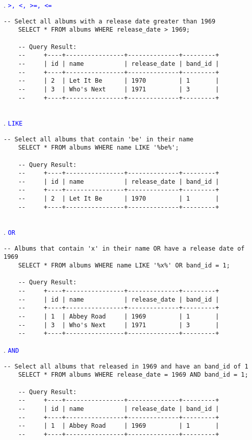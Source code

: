 . \textcolor{blue}{\texttt{>, <, >=, <=}}
\begin{lstlisting}[style=sql]
    -- Select all albums with a release date greater than 1969
    SELECT * FROM albums WHERE release_date > 1969;

    -- Query Result:
    --     +----+----------------+--------------+---------+
    --     | id | name           | release_date | band_id |
    --     +----+----------------+--------------+---------+
    --     | 2  | Let It Be      | 1970         | 1       |
    --     | 3  | Who's Next     | 1971         | 3       |
    --     +----+----------------+--------------+---------+
    
\end{lstlisting}

. \textcolor{blue}{\texttt{LIKE}}
\begin{lstlisting}[style=sql]
    -- Select all albums that contain 'be' in their name
    SELECT * FROM albums WHERE name LIKE '%be%';

    -- Query Result:
    --     +----+----------------+--------------+---------+
    --     | id | name           | release_date | band_id |
    --     +----+----------------+--------------+---------+
    --     | 2  | Let It Be      | 1970         | 1       |
    --     +----+----------------+--------------+---------+
    
\end{lstlisting}
. \textcolor{blue}{\texttt{OR}}
\begin{lstlisting}[style=sql]
    -- Albums that contain 'x' in their name OR have a release date of 1969 
    SELECT * FROM albums WHERE name LIKE '%x%' OR band_id = 1;

    -- Query Result:
    --     +----+----------------+--------------+---------+
    --     | id | name           | release_date | band_id |
    --     +----+----------------+--------------+---------+
    --     | 1  | Abbey Road     | 1969         | 1       |
    --     | 3  | Who's Next     | 1971         | 3       |
    --     +----+----------------+--------------+---------+
\end{lstlisting}

\newpage

. \textcolor{blue}{\texttt{AND}}
\begin{lstlisting}[style=sql]
    -- Select all albums that released in 1969 and have an band_id of 1
    SELECT * FROM albums WHERE release_date = 1969 AND band_id = 1;

    -- Query Result:
    --     +----+----------------+--------------+---------+
    --     | id | name           | release_date | band_id |
    --     +----+----------------+--------------+---------+
    --     | 1  | Abbey Road     | 1969         | 1       |
    --     +----+----------------+--------------+---------+
\end{lstlisting}

